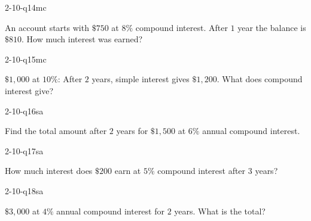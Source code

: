 \begin{practiceQuestion}{2-10-q14}{mc}
\begin{questionText}
An account starts with $\$750$ at $8\%$ compound interest. After $1$ year the balance is $\$810$. How much interest was earned?
\end{questionText}
\end{practiceQuestion}

\begin{practiceQuestion}{2-10-q15}{mc}
\begin{questionText}
$\$1{,}000$ at $10\%$: After $2$ years, simple interest gives $\$1{,}200$. What does compound interest give?
\end{questionText}
\end{practiceQuestion}


\begin{practiceQuestion}{2-10-q16}{sa}
\begin{questionText}
Find the total amount after $2$ years for $\$1{,}500$ at $6\%$ annual compound interest.
\end{questionText}
\end{practiceQuestion}

\begin{practiceQuestion}{2-10-q17}{sa}
\begin{questionText}
How much interest does $\$200$ earn at $5\%$ compound interest after $3$ years?
\end{questionText}
\end{practiceQuestion}

\begin{practiceQuestion}{2-10-q18}{sa}
\begin{questionText}
$\$3{,}000$ at $4\%$ annual compound interest for $2$ years. What is the total?
\end{questionText}
\end{practiceQuestion}

